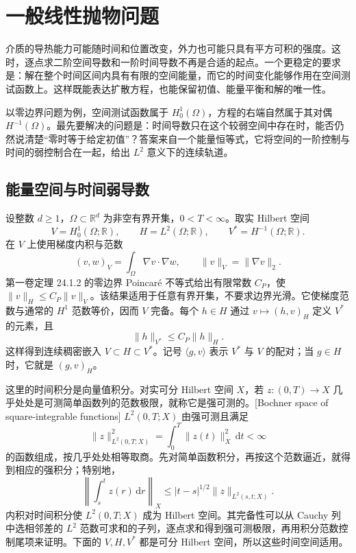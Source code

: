 \section{一般线性抛物问题}
\label{b2:sec:D206}

介质的导热能力可能随时间和位置改变，外力也可能只具有平方可积的强度。这时，逐点求二阶空间导数和一阶时间导数不再是合适的起点。一个更稳定的要求是：解在整个时间区间内具有有限的空间能量，而它的时间变化能够作用在空间测试函数上。这样既能表达扩散方程，也能保留初值、能量平衡和解的唯一性。

以零边界问题为例，空间测试函数属于 \(H_0^1(\Omega)\)，方程的右端自然属于其对偶 \(H^{-1}(\Omega)\)。最先要解决的问题是：时间导数只在这个较弱空间中存在时，能否仍然说清楚“零时等于给定初值”？答案来自一个能量恒等式，它将空间的一阶控制与时间的弱控制合在一起，给出 \(L^2\) 意义下的连续轨道。

\subsection{能量空间与时间弱导数}
\label{b2:subsec:D20601}

设整数 \(d\geq1\)，\(\Omega\subset\mathbb R^d\) 为非空有界开集，\(0<T<\infty\)。取实 Hilbert 空间
\[
 V=H_0^1(\Omega;\mathbb R),\qquad H=L^2(\Omega;\mathbb R),
 \qquad V^*=H^{-1}(\Omega;\mathbb R).
\]
在 \(V\) 上使用梯度内积与范数
\[
 (v,w)_V=\int_\Omega\nabla v\cdot\nabla w,
 \qquad \|v\|_V=\|\nabla v\|_2.
\]
第一卷定理 24.1.2 的零边界 Poincaré 不等式给出有限常数 \(C_P\)，使 \(\|v\|_H\leq C_P\|v\|_V\)。该结果适用于任意有界开集，不要求边界光滑。它使梯度范数与通常的 \(H^1\) 范数等价，因而 \(V\) 完备。每个 \(h\in H\) 通过 \(v\mapsto(h,v)_H\) 定义 \(V^*\) 的元素，且
\[
 \|h\|_{V^*}\leq C_P\|h\|_H.
\]
这样得到连续稠密嵌入 \(V\subset H\subset V^*\)。记号 \(\langle g,v\rangle\) 表示 \(V^*\) 与 \(V\) 的配对；当 \(g\in H\) 时，它就是 \((g,v)_H\)。

\ProseParagraphBreak

这里的时间积分是向量值积分。对实可分 Hilbert 空间 \(X\)，若 \(z:(0,T)\to X\) 几乎处处是可测简单函数列的范数极限，就称它是强可测的。[Bochner space of square-integrable functions] \(L^2(0,T;X)\) 由强可测且满足
\[
 \|z\|_{L^2(0,T;X)}^2=\int_0^T\|z(t)\|_X^2\,\mathrm dt<\infty
\]
的函数组成，按几乎处处相等取商。先对简单函数积分，再按这个范数逼近，就得到相应的强积分；特别地，
\[
 \left\|\int_s^tz(r)\,\mathrm dr\right\|_X
 \leq |t-s|^{1/2}\|z\|_{L^2(s,t;X)}.
\]
内积对时间积分使 \(L^2(0,T;X)\) 成为 Hilbert 空间。其完备性可以从 Cauchy 列中选相邻差的 \(L^2\) 范数可求和的子列，逐点求和得到强可测极限，再用积分范数控制尾项来证明。下面的 \(V,H,V^*\) 都是可分 Hilbert 空间，所以这些时间空间适用。

